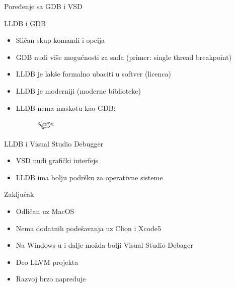 \documentclass[bookmarks=true,bookmarksopen=true,pdfborder={0 0 0},pdfhighlight={/N},linkbordercolor={.5 .5 .5},implicit=false,unicode,xcolor={table}]{beamer}
\begin{document}
\begin{frame}{Poređenje sa GDB i VSD}
	
	LLDB i GDB
	\begin{itemize}
		\item Sličan skup komandi i opcija
		\item GDB nudi više mogućnosti za sada (primer: single thread breakpoint)
		\item LLDB je lakše formalno ubaciti u softver (licenca)
		\item LLDB je moderniji (moderne biblioteke)
		\item LLDB nema maskotu kao GDB:
		\begin{figure}
			\includegraphics[width=10mm,height=5mm]{Slike/gdb_mascot.png}
		\end{figure}
	\end{itemize}
	
	LLDB i Visual Studio Debugger
	\begin{itemize}
		\item VSD nudi grafički interfejs
		\item LLDB ima bolju podršku za operativne sisteme
	\end{itemize}

\end{frame}

\begin{frame}{Zaključak}
\begin{itemize}
	\item Odličan uz MacOS
	\item Nema dodatnih podešavanja uz Clion i Xcode5
	\item Na Windows-u i dalje možda bolji Visual Studio Debager
	\item Deo LLVM projekta
	\item Razvoj brzo napreduje
\end{itemize}
\end{frame}
\end{document}
